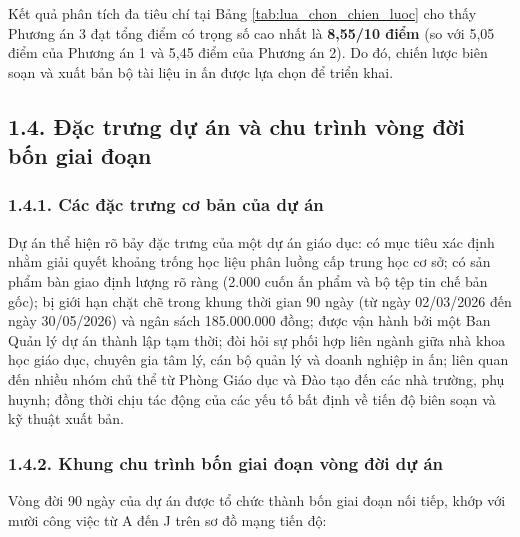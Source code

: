 Kết quả phân tích đa tiêu chí tại Bảng \ref{tab:lua_chon_chien_luoc} cho thấy Phương án 3 đạt tổng điểm có trọng số cao nhất là \textbf{8,55/10 điểm} (so với 5,05 điểm của Phương án 1 và 5,45 điểm của Phương án 2). Do đó, chiến lược biên soạn và xuất bản bộ tài liệu in ấn được lựa chọn để triển khai.

\subsection*{1.4. Đặc trưng dự án và chu trình vòng đời bốn giai đoạn}

\subsubsection*{1.4.1. Các đặc trưng cơ bản của dự án}

Dự án thể hiện rõ bảy đặc trưng của một dự án giáo dục: có mục tiêu xác định nhằm giải quyết khoảng trống học liệu phân luồng cấp trung học cơ sở; có sản phẩm bàn giao định lượng rõ ràng (2.000 cuốn ấn phẩm và bộ tệp tin chế bản gốc); bị giới hạn chặt chẽ trong khung thời gian 90 ngày (từ ngày 02/03/2026 đến ngày 30/05/2026) và ngân sách 185.000.000 đồng; được vận hành bởi một Ban Quản lý dự án thành lập tạm thời; đòi hỏi sự phối hợp liên ngành giữa nhà khoa học giáo dục, chuyên gia tâm lý, cán bộ quản lý và doanh nghiệp in ấn; liên quan đến nhiều nhóm chủ thể từ Phòng Giáo dục và Đào tạo đến các nhà trường, phụ huynh; đồng thời chịu tác động của các yếu tố bất định về tiến độ biên soạn và kỹ thuật xuất bản.

\subsubsection*{1.4.2. Khung chu trình bốn giai đoạn vòng đời dự án}

Vòng đời 90 ngày của dự án được tổ chức thành bốn giai đoạn nối tiếp, khớp với mười công việc từ A đến J trên sơ đồ mạng tiến độ:

